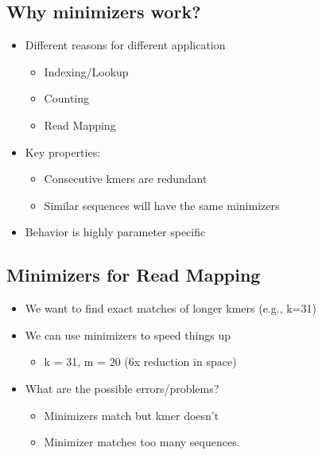 \documentclass[10pt]{article}
\begin{document}
\subsection*{Why minimizers work?}
\begin{itemize}
    \item Different reasons for different application
    \begin{itemize}
        \item Indexing/Lookup
        \item Counting
        \item Read Mapping
    \end{itemize}
    \item Key properties:
    \begin{itemize}
        \item Consecutive kmers are redundant
        \item Similar sequences will have the same minimizers
    \end{itemize}
    \item Behavior is highly parameter specific
\end{itemize}

\subsection*{Minimizers for Read Mapping}
\begin{itemize}
    \item We want to find exact matches of longer kmers (e.g., k=31)
    \item We can use minimizers to speed things up
    \begin{itemize}
        \item k = 31, m = 20 (6x reduction in space)
    \end{itemize}
    \item What are the possible errors/problems?
    \begin{itemize}
        \item Minimizers match but kmer doesn't 
        \item Minimizer matches too many sequences.
    \end{itemize}
\end{itemize}
\end{document}

